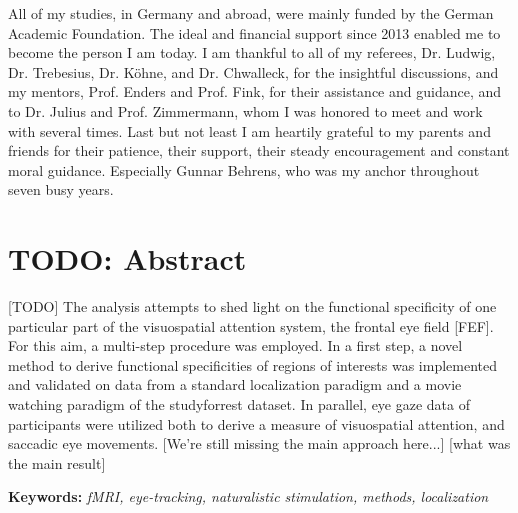 \documentclass[a4paper, 12pt]{scrreprt}
\begin{document}
All of my studies, in Germany and abroad, were mainly funded by the German Academic Foundation. The ideal and financial support since 2013 enabled me to become the person I am today. I am thankful to all of my referees, Dr. Ludwig, Dr. Trebesius, Dr. Köhne, and Dr. Chwalleck, for the insightful discussions, and my mentors, Prof. Enders and Prof. Fink, for their assistance and guidance, and to Dr. Julius and Prof. Zimmermann, whom I was honored to meet and work with several times. \newline
Last but not least I am heartily grateful to my parents and friends for their patience, their support, their steady encouragement and constant moral guidance. Especially Gunnar Behrens, who was my anchor throughout seven busy years.


\clearpage

\setcounter{page}{1}	%


\chapter*{TODO: Abstract}

[TODO]     \newline
The analysis attempts to shed light on the functional specificity of one particular part of the visuospatial attention system, the frontal eye field [FEF]. For this aim, a multi-step procedure was employed. In a first step, a novel method to derive functional specificities of regions of interests was implemented and validated on data from a standard localization paradigm and a movie watching paradigm of the studyforrest dataset. In parallel, eye gaze data of participants were utilized both to derive a measure of visuospatial attention, and saccadic eye movements. 
[We're still missing the main approach here...]
[what was the main result] 

\bigskip

\textbf{Keywords:} \textit{fMRI, eye-tracking, naturalistic stimulation, methods, localization}
\end{document}
